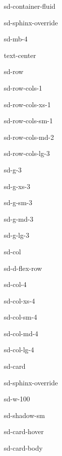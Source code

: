 \documentclass[letterpaper,10pt,english]{jupyterBook}
\begin{document}
\begin{sphinxuseclass}{sd-container-fluid}
\begin{sphinxuseclass}{sd-sphinx-override}
\begin{sphinxuseclass}{sd-mb-4}
\begin{sphinxuseclass}{text-center}
\begin{sphinxuseclass}{sd-row}
\begin{sphinxuseclass}{sd-row-cols-1}
\begin{sphinxuseclass}{sd-row-cols-xs-1}
\begin{sphinxuseclass}{sd-row-cols-sm-1}
\begin{sphinxuseclass}{sd-row-cols-md-2}
\begin{sphinxuseclass}{sd-row-cols-lg-3}
\begin{sphinxuseclass}{sd-g-3}
\begin{sphinxuseclass}{sd-g-xs-3}
\begin{sphinxuseclass}{sd-g-sm-3}
\begin{sphinxuseclass}{sd-g-md-3}
\begin{sphinxuseclass}{sd-g-lg-3}
\begin{sphinxuseclass}{sd-col}
\begin{sphinxuseclass}{sd-d-flex-row}
\begin{sphinxuseclass}{sd-col-4}
\begin{sphinxuseclass}{sd-col-xs-4}
\begin{sphinxuseclass}{sd-col-sm-4}
\begin{sphinxuseclass}{sd-col-md-4}
\begin{sphinxuseclass}{sd-col-lg-4}
\begin{sphinxuseclass}{sd-card}
\begin{sphinxuseclass}{sd-sphinx-override}
\begin{sphinxuseclass}{sd-w-100}
\begin{sphinxuseclass}{sd-shadow-sm}
\begin{sphinxuseclass}{sd-card-hover}
\begin{sphinxuseclass}{sd-card-body}
\end{sphinxuseclass}{\hyperref[\detokenize{5_BVPs/5.0_BVPs::doc}]{}}
\end{sphinxuseclass}
\end{sphinxuseclass}
\end{sphinxuseclass}
\end{sphinxuseclass}
\end{sphinxuseclass}
\end{sphinxuseclass}
\end{sphinxuseclass}
\end{sphinxuseclass}
\end{sphinxuseclass}
\end{sphinxuseclass}
\end{sphinxuseclass}
\end{sphinxuseclass}
\end{sphinxuseclass}
\end{sphinxuseclass}
\end{sphinxuseclass}
\end{sphinxuseclass}
\end{sphinxuseclass}
\end{sphinxuseclass}
\end{sphinxuseclass}
\end{sphinxuseclass}
\end{sphinxuseclass}
\end{sphinxuseclass}
\end{sphinxuseclass}
\end{sphinxuseclass}
\end{sphinxuseclass}
\end{sphinxuseclass}
\end{sphinxuseclass}
\begin{DUlineblock}{0em}
\item[] 
\end{DUlineblock}
\end{document}
